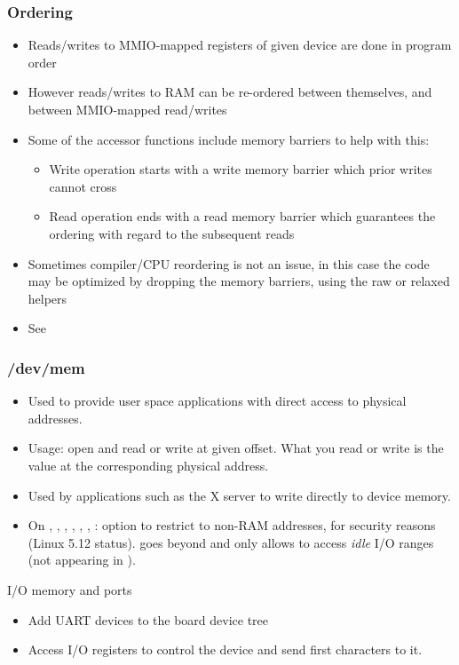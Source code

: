 \begin{frame}[fragile]
  \frametitle{Ordering}
  \begin{itemize}
  \item Reads/writes to MMIO-mapped registers of given device are done
    in program order
  \item However reads/writes to RAM can be re-ordered between
    themselves, and between MMIO-mapped read/writes
  \item Some of the accessor functions include memory barriers to help
    with this:
    \begin{itemize}
    \item Write operation starts with a write memory barrier which prior
      writes cannot cross
    \item Read operation ends with a read memory barrier which
      guarantees the ordering with regard to the subsequent reads
    \end{itemize}
  \item Sometimes compiler/CPU reordering is not an issue, in this case
    the code may be optimized by dropping the memory barriers, using the
    raw or relaxed helpers
  \item See 
  \end{itemize}
\end{frame}

\begin{frame}
  \frametitle{/dev/mem}
  \begin{itemize}
  \item Used to provide user space applications with direct access to
    physical addresses.
  \item Usage: open  and read or write at given offset.
    What you read or write is the value at the corresponding physical
    address.
  \item Used by applications such as the X server to write directly to
    device memory.
  \item On , , , ,
    , , :
     option to restrict 
    to non-RAM addresses, for security reasons (Linux 5.12 status).
     goes beyond and only allows to access
    {\em idle} I/O ranges (not appearing in ).
\end{itemize}
\end{frame}

\setuplabframe
{I/O memory and ports}
{
\begin{itemize}
\item Add UART devices to the board device tree
\item Access I/O registers to control the device and
      send first characters to it.
\end{itemize}
}
